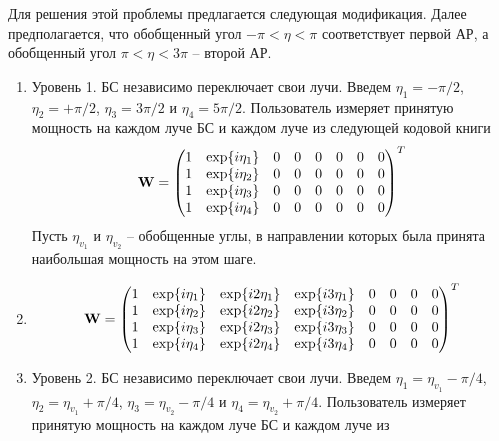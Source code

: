 Для решения этой проблемы предлагается следующая модификация.
Далее предполагается, что обобщенный угол $-\pi < \eta < \pi$ соответствует первой АР,
а обобщенный угол $\pi < \eta < 3\pi$ -- второй АР.
\begin{enumerate}[label=\textbf{Шаг \arabic*:}]
    \item Уровень 1. БС независимо переключает свои лучи. Введем $\eta_1 = -\pi/2$,
          $\eta_2 = + \pi/2$, $\eta_3 = 3\pi/2$ и $\eta_4 = 5\pi/2$. Пользователь измеряет принятую мощность
          на каждом луче БС и каждом луче из следующей кодовой книги
          \begin{equation}
              \vec W =
              \begin{pmatrix}
                  \mqty{
                  1 & \exp{i\eta_1}      \\
                  1 & \exp{i\eta_2}      \\
                  1 & \exp{i\eta_3}      \\
                  1 & \exp{i\eta_4}      \\
                  }
                    & \mqty{\zmat{4}{6}}
              \end{pmatrix}^T
          \end{equation}
          Пусть $\eta_{v_1}$ и $\eta_{v_2}$ -- обобщенные углы, в направлении которых
          была принята наибольшая мощность на этом шаге.
    \item
          \begin{equation}
              \vec W =
              \begin{pmatrix}
                  \mqty{
                  1 & \exp{i\eta_1}      & \exp{i2\eta_1} & \exp{i3\eta_1} \\
                  1 & \exp{i\eta_2}      & \exp{i2\eta_2} & \exp{i3\eta_2} \\
                  1 & \exp{i\eta_3}      & \exp{i2\eta_3} & \exp{i3\eta_3} \\
                  1 & \exp{i\eta_4}      & \exp{i2\eta_4} & \exp{i3\eta_4} \\
                  }
                    & \mqty{\zmat{4}{4}}
              \end{pmatrix}^T
          \end{equation}
    \item Уровень 2. БС независимо переключает свои лучи. Введем $\eta_1 = \eta_{v_1}-\pi/4$,
          $\eta_2 = \eta_{v_1} + \pi/4$, $\eta_3 = \eta_{v_2} - \pi/4$ и $\eta_4 = \eta_{v_2} + \pi/4$.
          Пользователь измеряет принятую мощность на каждом луче БС и каждом луче из

\end{enumerate}
